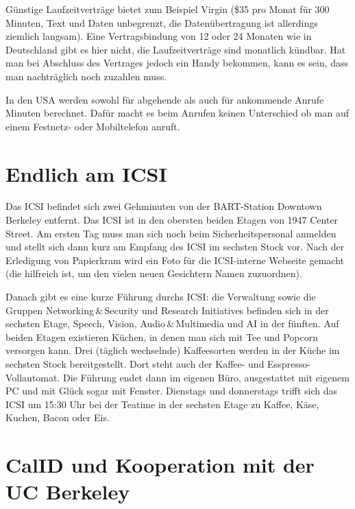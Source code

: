 \documentclass[a4paper]{scrreprt}
\begin{document}
Günstige Laufzeitverträge bietet zum Beispiel Virgin (\$35 pro Monat für 300 Minuten, Text und Daten unbegrenzt, die Datenübertragung ist allerdings ziemlich langsam). Eine Vertragsbindung von 12 oder 24 Monaten wie in Deutschland gibt es hier nicht, die Laufzeitverträge sind monatlich kündbar. Hat man bei Abschluss des Vertrages jedoch ein Handy bekommen, kann es sein, dass man nachträglich noch zuzahlen muss.

In den USA werden sowohl für abgehende als auch für ankommende Anrufe Minuten berechnet. Dafür macht es beim Anrufen keinen Unterschied ob man auf einem Festnetz- oder Mobiltelefon anruft.

\section{Endlich am ICSI}

Das ICSI befindet sich zwei Gehminuten von der BART-Station Downtown Berkeley entfernt. Das ICSI ist in den obersten beiden Etagen von 1947 Center Street. Am ersten Tag muss man sich noch beim Sicherheitspersonal anmelden und stellt sich dann kurz am Empfang des ICSI im sechsten Stock vor. Nach der Erledigung von  Papierkram wird ein Foto für die ICSI-interne Webseite gemacht (die hilfreich ist, um den vielen neuen Gesichtern Namen zuzuordnen).

Danach gibt es eine kurze Führung durchs ICSI: die Verwaltung sowie die Gruppen Networking\,\&\,Security und Research Initiatives befinden sich in der sechsten Etage, Speech, Vision, Audio\,\&\,Multimedia und AI in der fünften. Auf beiden Etagen existieren Küchen, in denen man sich mit Tee und Popcorn versorgen kann. Drei (täglich wechselnde) Kaffeesorten werden in der Küche im sechsten Stock bereitgestellt. Dort steht auch der Kaffee- und Esspresso-Vollautomat. Die Führung endet dann im eigenen Büro, ausgestattet mit eigenem PC und mit Glück sogar mit Fenster. Dienstags und donnerstags trifft sich das ICSI um 15:30 Uhr bei der Teatime in der sechsten Etage zu Kaffee, Käse, Kuchen, Bacon oder Eis.

\section{CalID und Kooperation mit der UC Berkeley}
\end{document}
